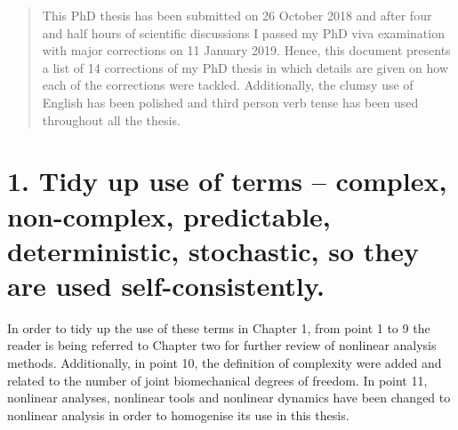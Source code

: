 \documentclass[12pt]{article}
\begin{document}
\maketitle


\begin{abstract}
This PhD thesis has been submitted on 26 October 2018 and
after four and half hours of scientific discussions 
I passed my PhD viva examination with major corrections  
on 11 January 2019. 
Hence, this document presents a list of 14 corrections 
of my PhD thesis in which details are given on how each 
of the corrections were tackled.
Additionally, the clumsy use of English has been polished and 
third person verb tense has been used throughout all the thesis.
\end{abstract}





\section*{1.  
	Tidy up use of terms -- complex, non-complex, predictable, 
	deterministic, stochastic, so they are used self-consistently.
}


In order to tidy up the use of these terms in Chapter 1,
from point 1 to 9 the reader is being referred to 
Chapter two for further review of nonlinear analysis methods. 
Additionally, in point 10, the definition of complexity were added 
and related to the number of joint biomechanical degrees of freedom.
In point 11, 
nonlinear analyses, nonlinear tools and nonlinear dynamics 
have been changed to nonlinear analysis
in order to homogenise its use in this thesis.
\end{document}
